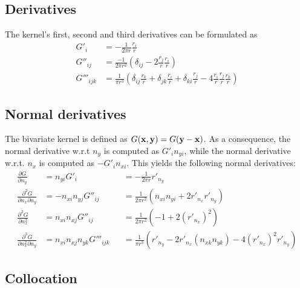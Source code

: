 \documentclass[a4paper,11pt]{article}
\begin{document}
\subsection{Derivatives}

The kernel's first, second and third derivatives can be formulated as
%
\begin{align}
	G'_{i}
	&= -\frac{1}{2\pi r} \frac{r_i}{r}
	\label{eq:laplace_gradient}
	\\
	G''_{ij}
	&= \frac{-1}{2\pi r^2}\left( \delta_{ij} - 2\frac{r_j}{r} \frac{r_i}{r}\right)
	\label{eq:laplace_second_derivative}
	\\
	G'''_{ijk}
	&= \frac{1}{\pi r^3} \left(
	\delta_{ij} \frac{r_k}{r}
	+ \delta_{jk} \frac{r_i}{r}
	+ \delta_{ki} \frac{r_j}{r}
	-4 \frac{r_i}{r} \frac{r_j}{r} \frac{r_k}{r}
	\right)
	\label{eq:laplace_third_derivative}
\end{align}

\subsection{Normal derivatives}

The bivariate kernel is defined as $G({\bf x}, {\bf y}) = G({\bf y}-{\bf x})$.
As a consequence, the normal derivative w.r.t $n_y$ is computed as $G'_i n_{yi}$, while the normal derivative w.r.t. $n_x$ is computed as $-G'_i n_{xi}$.
This yields the following normal derivatives:
%
\begin{align}
	\frac{\partial G}{\partial n_y} 
	&= n_{yi} G'_i
	&&
	= -\frac{1}{2\pi r} r'_{n_y}
	\\
	\frac{\partial^2 G}{\partial n_x \partial n_y}
	&= -n_{xi} n_{yj} G''_{ij}
	&&
	= \frac{1}{2\pi r^2}\left( n_{xi} n_{yi} + 2 r'_{n_x} r'_{n_y}\right)
	\\
	\frac{\partial^2 G}{\partial n_x^2}
	&= n_{xi} n_{xj} G''_{ij}
	&&
	= \frac{1}{2\pi r^2}\left( -1 + 2 \left(r'_{n_x}\right)^2 \right)
	\\
	\frac{\partial^3 G}{\partial n_x^2 \partial n_y}
	&= n_{xi} n_{xj} n_{yk} G'''_{ijk}
	&&
	= \frac{1}{\pi r^3} 
	 \left(
	r'_{n_y}
	- 2 r'_{n_x} \left(n_{xk} n_{yk}\right)
	-4 \left(r'_{n_x}\right)^2 r'_{n_y}
	\right)
\end{align}

\subsection{Collocation}
\end{document}

